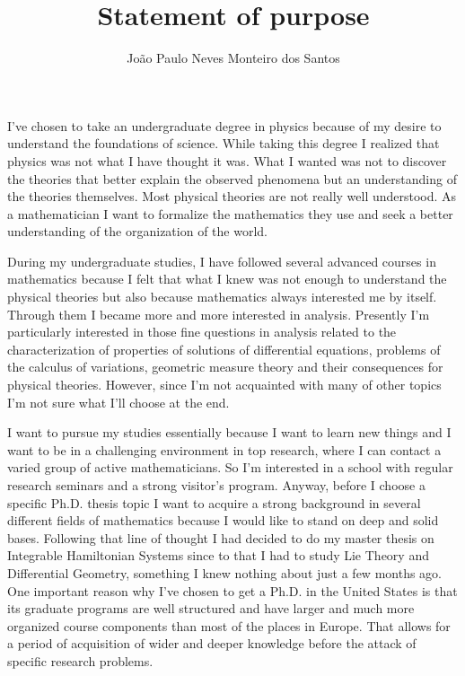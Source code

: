 

\newcommand{\Rr}{\Bbb R}
\newcommand{\Qq}{\Bbb Q}

\title{Statement of purpose}

\author{Jo\~ao Paulo Neves Monteiro dos Santos}



\maketitle

I've chosen to take an undergraduate degree in physics
because of my desire to under\-stand the foundations of science.
While taking this degree I realized that physics was not what
I have thought it was. What I wanted was not to discover the theories
that better
explain the observed phenomena but an understanding of the theories
themselves.
Most physical theories are not really well understood.
As a mathematician I want 
to formalize the mathematics they use and seek a better understanding of the 
organization of the world.

During my undergraduate studies, I have followed
several advanced courses in mathematics because I felt that what I knew
was not enough to understand the physical
theories but also because mathematics always interested me by itself.
Through them I became more and more interested in analysis.
Presently I'm particularly interested in those
fine questions in analysis
related to the characterization of properties of solutions of
differential equations, problems of the calculus of variations, geometric
measure theory and their consequences for physical theories. However, since I'm
not acquainted with many of other topics I'm not sure what I'll choose at the
end.

I want to pursue my studies essentially because
I want to learn new things and I want to be in a challenging environment in
top research, where I can contact a varied group of active mathematicians.
So I'm interested in a school with regular research seminars and
a strong visitor's program. Anyway,
before I choose a specific Ph.D. thesis topic I want to acquire a strong
background in several different fields of mathematics
because I would like to stand on deep and solid bases.
Following that line  of thought I had decided to do my master thesis on
Integrable Hamiltonian Systems since to that I had to study Lie Theory and
Differential Geometry, something I knew nothing about just a few months ago. One
important reason why I've chosen to get a Ph.D. in the United States is that its
graduate programs are well structured and have larger and much more organized
course components than most of the places in Europe. That allows for a period of
acquisition of wider and deeper knowledge before the attack of specific research
problems.

